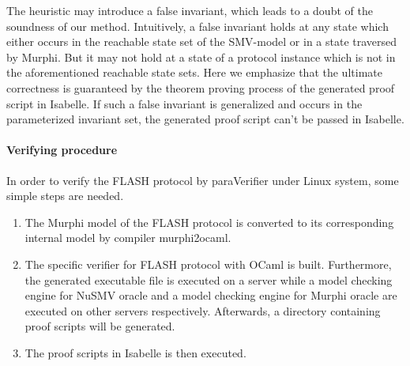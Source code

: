 \documentclass{llncs}
\newlength{\fminilength}
\newenvironment{fmini}[1][\linewidth]
  {\setlength{\fminilength}{#1\fboxsep-2\fboxrule}%
   \vspace{2ex}\noindent\begin{lrbox}{\fminibox}\begin{minipage}{\fminilength}%
   \mbox{ }\hfill\vspace{-2.5ex}}%
  {\end{minipage}\end{lrbox}\vspace{1ex}\hspace{0ex}%
   \framebox{\usebox{\fminibox}}}
\newenvironment{specification}
{\noindent\scriptsize
\tt\begin{fmini}\begin{tabbing}X\=X12345\=XXXX\=XXXX\=XXXX\=XXXX\=XXXX
\=\+\kill} {\end{tabbing}\normalfont\end{fmini}}
\newcommand{\bedt}[1]{{\color{black}#1}}
\newcommand{\forget}[1]{}
\begin{document}
 The \bedt{heuristic} may introduce a false invariant, which leads to a doubt of the soundness of our method.  Intuitively, a  false invariant holds at any   state which either occurs in the reachable state set of the SMV-model or in a state traversed by Murphi. But it may not hold at a state of a protocol instance which is not in the aforementioned reachable state sets. Here we emphasize that the ultimate correctness is guaranteed by the theorem proving process of the generated proof script in Isabelle. If such a false invariant is generalized and occurs in the parameterized invariant set, the generated proof script can't be passed in Isabelle.

\vspace{-10pt}
\paragraph{Verifying \bedt{procedure}}  In order to verify the FLASH protocol by {\sf paraVerifier} under Linux system, some simple steps are needed.

\begin{enumerate}
\item The Murphi model of the FLASH protocol is converted to its corresponding internal model by compiler {\sf murphi2ocaml}.
\item The specific verifier for FLASH protocol with OCaml is built. Furthermore, the generated executable file is  executed on a server while a model checking engine for NuSMV oracle and a model checking engine for Murphi oracle are executed on other servers respectively. Afterwards, a directory containing proof scripts will be generated.
\item The proof scripts in Isabelle is then executed.
\end{enumerate}

\forget{
Firstly, we convert Murphi model of the FLASH protocol to its corresponding internal model by compiler {\sf murphi2ocaml} supposing that the compiler was put in path {\sf\$\{moc\}}.

\begin{specification}
  \$ python \$\{moc\}/gen.py -m flash.m > flash.ml
\end{specification}

Secondly, we build the specific verifier for the FLASH protocol with OCaml and run the generated executable file supposing that address of the NuSMV oracle was {\sf vserv} and address of the Murphi oracle was {\sf mserv}. Afterwards, a directory named {\sf n\_flash} where proof scripts were put will be generated.

\begin{specification}
  corebuild flash.byte -pkg re2 -I src\\
  ./flash.byte -vh vserv -mh mserv
\end{specification}

Finally, we run the proof scripts in Isabelle.

\begin{specification}
  cd n\_flash\\
  ./run.sh
\end{specification}
}
\end{document}

